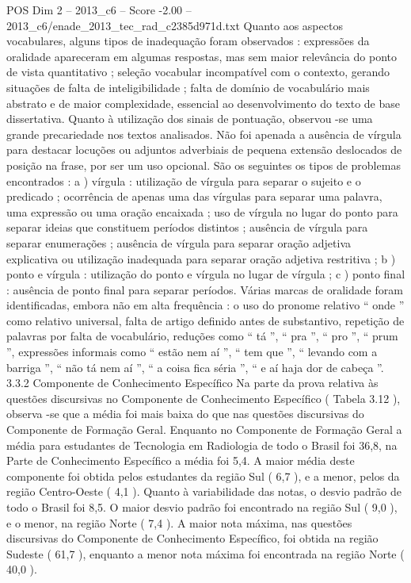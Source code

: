 \begin{textsample}{POS Dim 2 – 2013\_c6 – Score -2.00 – 2013\_c6/enade\_2013\_tec\_rad\_c2385d971d.txt}
Quanto aos aspectos vocabulares, alguns tipos de inadequação foram observados : expressões da oralidade apareceram em algumas respostas, mas sem maior relevância do ponto de vista quantitativo ; seleção vocabular incompatível com o contexto, gerando situações de falta de inteligibilidade ; falta de domínio de vocabulário mais abstrato e de maior complexidade, essencial ao desenvolvimento do texto de base dissertativa.
Quanto à utilização dos sinais de pontuação, observou -se uma grande precariedade nos textos analisados.
Não foi apenada a ausência de vírgula para destacar locuções ou adjuntos adverbiais de pequena extensão deslocados de posição na frase, por ser um uso opcional.
São os seguintes os tipos de problemas encontrados : a ) vírgula : utilização de vírgula para separar o sujeito e o predicado ; ocorrência de apenas uma das vírgulas para separar uma palavra, uma expressão ou uma oração encaixada ; uso de vírgula no lugar do ponto para separar ideias que constituem períodos distintos ; ausência de vírgula para separar enumerações ; ausência de vírgula para separar oração adjetiva explicativa ou utilização inadequada para separar oração adjetiva restritiva ; b ) ponto e vírgula : utilização do ponto e vírgula no lugar de vírgula ; c ) ponto final : ausência de ponto final para separar períodos.
Várias marcas de oralidade foram identificadas, embora não em alta frequência : o uso do pronome relativo “ onde ” como relativo universal, falta de artigo definido antes de substantivo, repetição de palavras por falta de vocabulário, reduções como “ tá ”, “ pra ”, “ pro ”, “ prum ”, expressões informais como “ estão nem aí ”, “ tem que ”, “ levando com a barriga ”, “ não tá nem aí ”, “ a coisa fica séria ”, “ e aí haja dor de cabeça ”. 3.3.2 Componente de Conhecimento Específico Na parte da prova relativa às questões discursivas no Componente de Conhecimento Específico ( Tabela 3.12 ), observa -se que a média foi mais baixa do que nas questões discursivas do Componente de Formação Geral.
Enquanto no Componente de Formação Geral a média para estudantes de Tecnologia em Radiologia de todo o Brasil foi 36,8, na Parte de Conhecimento Específico a média foi 5,4.
A maior média deste componente foi obtida pelos estudantes da região Sul ( 6,7 ), e a menor, pelos da região Centro-Oeste ( 4,1 ).
Quanto à variabilidade das notas, o desvio padrão de todo o Brasil foi 8,5.
O maior desvio padrão foi encontrado na região Sul ( 9,0 ), e o menor, na região Norte ( 7,4 ).
A maior nota máxima, nas questões discursivas do Componente de Conhecimento Específico, foi obtida na região Sudeste ( 61,7 ), enquanto a menor nota máxima foi encontrada na região Norte ( 40,0 ).

\end{textsample}
